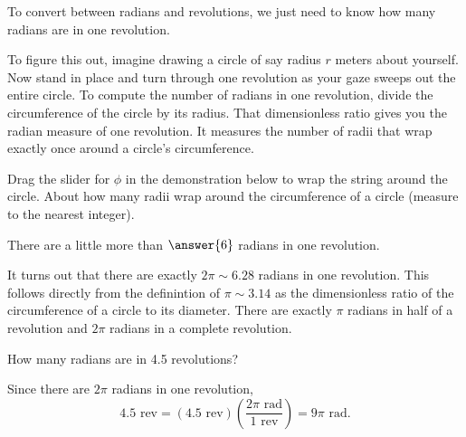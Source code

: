 \documentclass{ximera}
\begin{document}
\begin{exploration}  \label{E33:Angles}
To convert between radians and revolutions, we just need to know how many radians are in one revolution.





To figure this out, imagine drawing a circle of say radius $r$ meters about yourself. Now stand in place and turn through one revolution as your gaze sweeps out the entire circle. To compute the number of radians in one revolution, divide the circumference of the circle by its radius. That dimensionless ratio gives you the radian measure of one revolution. It measures the number of radii that wrap exactly once around a circle's circumference.


\begin{question}
Drag the slider for $\phi$ in the demonstration below to wrap the string around the circle. About how many radii wrap around the circumference of a circle (measure to the nearest integer). 

There are a little more than $\answer{6}$ radians in one revolution.

\end{question}

It turns out that there are exactly $2\pi \sim 6.28$ radians in one revolution. This follows directly from the definintion of $\pi \sim 3.14$ as the dimensionless ratio of the circumference of a circle to its diameter. There are exactly $\pi$ radians in half of a revolution and $2\pi$ radians in a complete revolution.


 
\begin{onlineOnly}
    \begin{center}
\end{center}
\end{onlineOnly}
\end{exploration}


\begin{question}  \label{Q43:Angles}
How many radians are in 4.5 revolutions?

\begin{explanation}
Since there are $2\pi$ radians in one revolution,
\[
   4.5 \text{ rev} = (4.5 \text{ rev})  \left( \frac{2\pi \text{ rad}}{1 \text{ rev}}  \right)  = 9\pi \text{ rad} .
\]
\end{explanation}
\end{question}
\end{document}
